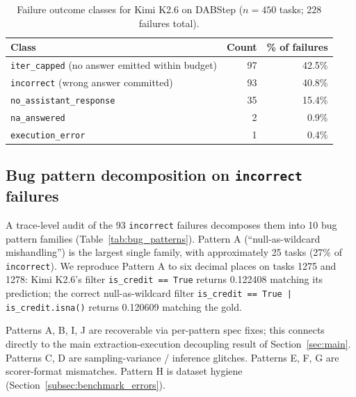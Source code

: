 \documentclass[conference]{IEEEtran}
\newcommand{\Kimi}{Kimi K2.6}
\begin{document}
\begin{table}[t]
\centering
\caption{Failure outcome classes for \Kimi{} on DABStep ($n=450$ tasks; 228 failures total).}
\label{tab:failure_classes}
\begin{tabular}{lrr}
\toprule
Class & Count & \% of failures \\
\midrule
\texttt{iter\_capped} (no answer emitted within budget) & 97 & 42.5\% \\
\texttt{incorrect} (wrong answer committed) & 93 & 40.8\% \\
\texttt{no\_assistant\_response} & 35 & 15.4\% \\
\texttt{na\_answered} & 2 & 0.9\% \\
\texttt{execution\_error} & 1 & 0.4\% \\
\bottomrule
\end{tabular}
\end{table}

\subsection{Bug pattern decomposition on \texttt{incorrect} failures}
\label{subsec:bug_patterns}

A trace-level audit of the 93 \texttt{incorrect} failures decomposes them into 10 bug pattern families (Table~\ref{tab:bug_patterns}). Pattern A (``null-as-wildcard mishandling'') is the largest single family, with approximately 25 tasks (27\% of \texttt{incorrect}). We reproduce Pattern A to six decimal places on tasks 1275 and 1278: \Kimi{}'s filter \texttt{is\_credit == True} returns 0.122408 matching its prediction; the correct null-as-wildcard filter \texttt{is\_credit == True | is\_credit.isna()} returns 0.120609 matching the gold.

Patterns A, B, I, J are recoverable via per-pattern spec fixes; this connects directly to the main extraction-execution decoupling result of Section~\ref{sec:main}. Patterns C, D are sampling-variance / inference glitches. Patterns E, F, G are scorer-format mismatches. Pattern H is dataset hygiene (Section~\ref{subsec:benchmark_errors}).
\end{document}
